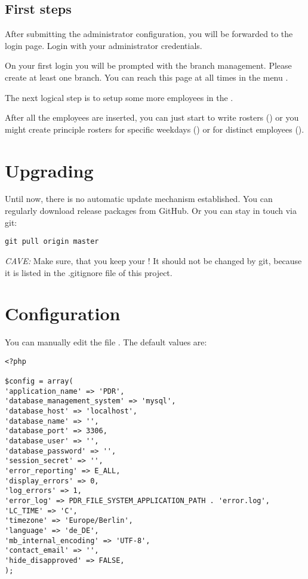 \subsection{First steps}
After submitting the administrator configuration, you will be forwarded to the login page.
Login with your administrator credentials.

On your first login you will be prompted with the branch management. 
Please create at least one branch. You can reach this page at all times in the menu .

The next logical step is to setup some more employees in the .

After all the employees are inserted, you can just start to write rosters () or you might create principle rosters for specific weekdays () or for distinct employees ().


\section{Upgrading}
Until now, there is no automatic update mechanism established.
You can regularly download release packages from GitHub. Or you can stay in touch via git:
\begin{lstlisting}
git pull origin master
\end{lstlisting}
\emph{CAVE:} Make sure, that you keep your ! It should not be changed by git, because it is listed in the .gitignore file of this project.


\section{Configuration}
You can manually edit the file .
The default values are:
\begin{lstlisting}
<?php

$config = array(
'application_name' => 'PDR',
'database_management_system' => 'mysql',
'database_host' => 'localhost',
'database_name' => '',
'database_port' => 3306,
'database_user' => '',
'database_password' => '',
'session_secret' => '',
'error_reporting' => E_ALL,
'display_errors' => 0,
'log_errors' => 1,
'error_log' => PDR_FILE_SYSTEM_APPLICATION_PATH . 'error.log',
'LC_TIME' => 'C',
'timezone' => 'Europe/Berlin',
'language' => 'de_DE',
'mb_internal_encoding' => 'UTF-8',
'contact_email' => '',
'hide_disapproved' => FALSE,
);
\end{lstlisting}


